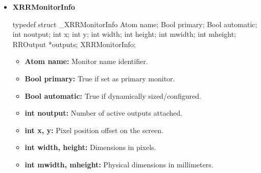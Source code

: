 \documentclass{report}
\begin{document}
\begin{itemize}
\begin{cppcode}
            void XRRFreeMonitors(XRRMonitorInfo* info);
            \end{cppcode}
            \bigbreak \noindent 
            Where
            \begin{itemize}
                \item \textbf{dpy:} Connection to the X server.
                \item \textbf{window:} Root window to select the screen/display.
                \item \textbf{get\_active:} Boolean flag to fetch only active monitors.
                \item \textbf{nmonitors:} Pointer to an integer returning the count of detected monitors.
            \end{itemize}
            \textbf{Note:} Link the program against \textbf{XRandr}
            \bigbreak \noindent 
            \begin{cppcode}
            -lXrandr
            \end{cppcode}
        \item \textbf{XRRMonitorInfo}
            \bigbreak \noindent 
            \begin{cppcode}
                typedef struct _XRRMonitorInfo {
                    Atom name;
                    Bool primary;
                    Bool automatic;
                    int noutput;
                    int x;
                    int y;
                    int width;
                    int height;
                    int mwidth;
                    int mheight;
                    RROutput *outputs;
                } XRRMonitorInfo;
            \end{cppcode}
            \begin{itemize}
                \item \textbf{Atom name:} Monitor name identifier.
                \item \textbf{Bool primary:} True if set as primary monitor.
                \item \textbf{Bool automatic:} True if dynamically sized/configured.
                \item \textbf{int noutput:} Number of active outputs attached.
                \item \textbf{int x, y:} Pixel position offset on the screen.
                \item \textbf{int width, height:} Dimensions in pixels.
                \item \textbf{int mwidth, mheight:} Physical dimensions in millimeters.

\end{itemize}
\end{itemize}
\end{document}

